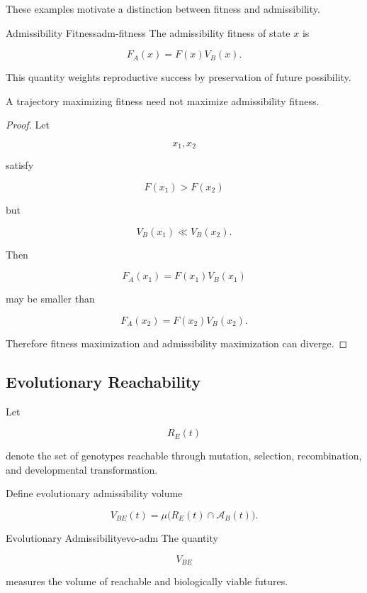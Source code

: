 \documentclass[12pt,twoside,openright]{book}
\newenvironment{prop}
{\begin{proposition}{}{}}
{\end{proposition}}
\begin{document}
These examples motivate a distinction between fitness and
admissibility.

\begin{definition}{Admissibility Fitness}{adm-fitness}
The admissibility fitness of state \(x\) is

\[
F_A(x)
=
F(x)V_B(x).
\]
\end{definition}

This quantity weights reproductive success by preservation
of future possibility.

\begin{prop}
A trajectory maximizing fitness need not maximize
admissibility fitness.
\end{prop}

\begin{proof}
Let

\[
x_1,x_2
\]

satisfy

\[
F(x_1)>F(x_2)
\]

but

\[
V_B(x_1)\ll V_B(x_2).
\]

Then

\[
F_A(x_1)
=
F(x_1)V_B(x_1)
\]

may be smaller than

\[
F_A(x_2)
=
F(x_2)V_B(x_2).
\]

Therefore fitness maximization and admissibility
maximization can diverge.
\end{proof}

\subsection{Evolutionary Reachability}

Let

\[
R_E(t)
\]

denote the set of genotypes reachable through mutation,
selection, recombination, and developmental
transformation.

Define evolutionary admissibility volume

\[
V_{BE}(t)
=
\mu
\bigl(
R_E(t)
\cap
\mathcal A_B(t)
\bigr).
\]

\begin{definition}{Evolutionary Admissibility}{evo-adm}
The quantity

\[
V_{BE}
\]

measures the volume of reachable and biologically viable
futures.
\end{definition}
\end{document}
